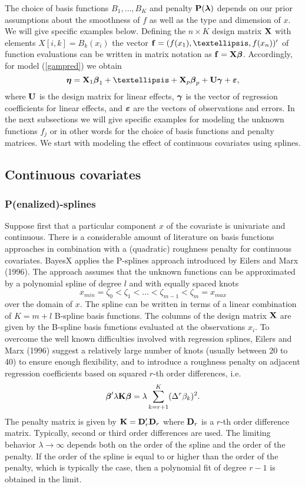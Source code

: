 \documentclass[11pt,a4paper,twoside]{bayesxarticle}
\begin{document}
The choice of basis functions $B_1,\dots,B_K$ and penalty  $\mathbf{P}(\boldsymbol{\lambda})$ depends on our prior assumptions about the smoothness
of $f$ as well as
the type and dimension of $x$. We will give specific examples below. Defining the $n \times K$ design matrix $\mathbf{X}$ with elements
$X[i,k] = B_k(x_i)$ the
vector $\fvec = (f(x_1),\dots,f(x_n))'$ of function evaluations can be written in matrix notation as $\mathbf{f} = \mathbf{X} \boldsymbol{\beta}$.
Accordingly,  for model (\ref{gampred}) we obtain
$$
\etavec = \Xvec_1 \betavec_1 + \ldots + \Xvec_p \betavec_p + \Uvec \gammavec +  \varepsilonvec,
$$
where $\mathbf{U}$ is the design matrix for linear effects, $\boldsymbol{\gamma}$ is the vector of regression coefficients for linear effects, and
$\boldsymbol{\varepsilon}$
are the vectors of observations and errors.
In the next subsections we will give specific examples for modeling the unknown functions $f_j$ or in other words for the choice of basis functions and
penalty matrices.
We start with modeling the effect of continuous covariates using splines.

\subsection{Continuous covariates}
\subsubsection{P(enalized)-splines}
Suppose first that a particular component $x$ of the covariate  is univariate and continuous. There is a considerable
amount of literature on basis functions approaches
in combination with a (quadratic) roughness penalty for continuous covariates.
BayesX applies the P-splines approach introduced by Eilers and Marx (1996).
The approach assumes that the unknown functions can be approximated
by a polynomial spline of degree $l$
and with equally spaced knots
$$
x_{min} = \zeta_{0}  < \zeta_{1} < \dots < \zeta_{m-1} < \zeta_{m} = x_{max}
$$
over the domain of
$x$.
The spline can be written in terms of a linear combination of $K=m+l$
B-spline basis functions.
The columns of the design matrix $\mathbf{X}$ are given by the B-spline basis functions
evaluated at the observations $x_i$. To overcome the well known difficulties involved with regression
splines, Eilers and Marx (1996)  suggest a relatively large
number of knots (usually between 20 to 40) to ensure enough
flexibility, and to introduce a roughness
penalty on adjacent regression coefficients based on
squared $r$-th order differences, i.e.
$$
\boldsymbol{\beta}' \lambda \mathbf{K} \boldsymbol{\beta} = \lambda \sum_{k=r+1}^K (\Delta^r \beta_k)^2.
$$
The penalty matrix is given by $\mathbf{K} =  \mathbf{D}_r' \mathbf{D}_r$ where $\mathbf{D}_r$ is a $r$-th order difference matrix.
Typically, second or third order differences are used. The limiting behavior $\lambda \rightarrow \infty$ depends both on the
order of the spline
and the order of the penalty. If the order of the spline is equal to or
higher than the order of  the penalty, which is typically the case, then a polynomial
fit of degree $r-1$ is obtained in the limit.
\end{document}
